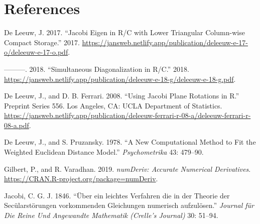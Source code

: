 \documentclass[
  12pt,
]{article}
\newlength{\cslhangindent}
\newenvironment{CSLReferences}[2] %
 {\begin{list}{}{%
  \setlength{\itemindent}{0pt}
  \setlength{\leftmargin}{0pt}
  \setlength{\parsep}{0pt}
  \ifodd #1
   \setlength{\leftmargin}{\cslhangindent}
   \setlength{\itemindent}{-1\cslhangindent}
  \fi
  \setlength{\itemsep}{#2\baselineskip}}}
 {\end{list}}
\begin{document}
\section*{References}\label{references}

\label{refs}
\begin{CSLReferences}{1}{0}
De Leeuw, J. 2017. {``{Jacobi Eigen in R/C with Lower Triangular Column-wise Compact Storage}.''} 2017. \url{https://jansweb.netlify.app/publication/deleeuw-e-17-o/deleeuw-e-17-o.pdf}.

---------. 2018. {``{Simultaneous Diagonalization in R/C}.''} 2018. \url{https://jansweb.netlify.app/publication/deleeuw-e-18-g/deleeuw-e-18-g.pdf}.

De Leeuw, J., and D. B. Ferrari. 2008. {``{Using Jacobi Plane Rotations in R}.''} Preprint Series 556. Los Angeles, CA: UCLA Department of Statistics. \url{https://jansweb.netlify.app/publication/deleeuw-ferrari-r-08-a/deleeuw-ferrari-r-08-a.pdf}.

De Leeuw, J., and S. Pruzansky. 1978. {``A New Computational Method to Fit the Weighted Euclidean Distance Model.''} \emph{Psychometrika} 43: 479--90.

Gilbert, P., and R. Varadhan. 2019. \emph{{numDeriv: Accurate Numerical Derivatives}}. \url{https://CRAN.R-project.org/package=numDeriv}.

Jacobi, C. G. J. 1846. {``{{Ü}ber ein leichtes Verfahren die in der Theorie der Sec{ü}larst{ö}rungen vorkommenden Gleichungen numerisch aufzul{ö}sen}.''} \emph{Journal f{ü}r Die Reine Und Angewandte Mathematik (Crelle's Journal)} 30: 51--94.

\end{CSLReferences}
\end{document}
